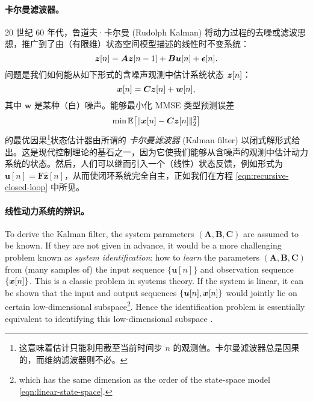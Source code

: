 \documentclass[../../book-main.tex]{subfiles}
\begin{document}
\paragraph{卡尔曼滤波器。} 
20 世纪 60 年代，鲁道夫·卡尔曼 (Rudolph Kalman) 将动力过程的去噪或滤波思想，推广到了由（有限维）状态空间模型描述的线性时不变系统：
\begin{equation}
    \bm{z}[n] = \boldsymbol{A} \bm{z}[n-1] + \boldsymbol{B}\boldsymbol{u}[n] + \boldsymbol{\epsilon}[n]. 
    \label{eqn:linear-state-space}
\end{equation}
问题是我们如何能从如下形式的含噪声观测中估计系统状态 $\bm{z}[n]$： \begin{equation}\bm{x}[n] = \boldsymbol{C} \bm{z}[n] + \boldsymbol{w}[n],
\label{eqn:Kalman-model}
\end{equation}
其中 $\boldsymbol{w}$ 是某种（白）噪声。能够最小化 MMSE 类型预测误差
\begin{equation}
    \min \mathbb{E}\big[ \|\bm{x}[n] - \boldsymbol{C}\bm{z}[n]\|_2^2\big]
\end{equation}
的最优因果\footnote{这意味着估计只能利用截至当前时间步 $n$ 的观测值。卡尔曼滤波器总是因果的，而维纳滤波器则不必。}状态估计器由所谓的 {\em 卡尔曼滤波器} (Kalman filter) \cite{kalman1960new} 以闭式解形式给出。这是现代控制理论的基石之一，因为它使我们能够从含噪声的观测中估计动力系统的状态。然后，人们可以继而引入一个（线性）状态反馈，例如形式为 $\boldsymbol{u}[n] = \boldsymbol{F} \hat{\boldsymbol{z}}[n]$，从而使闭环系统完全自主，正如我们在方程 \eqref{eqn:recursive-closed-loop} 中所见。

\paragraph{线性动力系统的辨识。}

To derive the Kalman filter, the system parameters $(\boldsymbol{A}, \boldsymbol{B}, \boldsymbol{C})$ are assumed to be known. If they are not given in advance, it would be a more challenging problem known as {\em system identification}: how to {\em learn} the parameters $(\boldsymbol{A}, \boldsymbol{B}, \boldsymbol{C})$ from (many samples of) the input sequence $\{\boldsymbol{u}[n]\}$ and observation sequence $\{\bm{x}[n]\}$. This is a classic problem in systems theory. If the system is linear, it can be shown that the input and output sequences $\{\boldsymbol{u}[n], \bm{x}[n]\}$ would jointly lie on certain low-dimensional subspace\footnote{which has the same dimension as the order of the state-space model \eqref{eqn:linear-state-space}. }. Hence the identification problem is essentially equivalent to identifying this low-dimensional subspace \cite{OverscheeP1996,Liu-2009-CDC,Liu-2010-SIAM}. 
\end{document}
